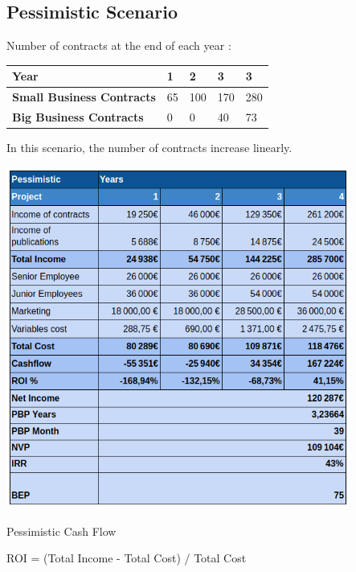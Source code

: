 \documentclass[./main.tex]{subfiles}
\begin{document}
\subsection{Pessimistic Scenario}
Number of contracts at the end of each year : 
\begin{table}[]
\begin{tabular}{|l|l|l|l|l|}
\hline
\textbf{Year}                     & 1  & 2   & 3   & 3   \\ \hline
\textbf{Small Business Contracts} & 65 & 100 & 170 & 280 \\ \hline
\textbf{Big Business Contracts}   & 0  & 0   & 40  & 73  \\ \hline
\end{tabular}
\end{table}
In this scenario, the number of contracts increase linearly.
\begin{table}[H]
	\centering
	\includegraphics[width=11.3cm]{pessimistic.png}
	\caption{Pessimistic Cash Flow}
	\label{tab:pessimistic}
\end{table}

ROI = (Total Income - Total Cost) / Total Cost
\end{document}
